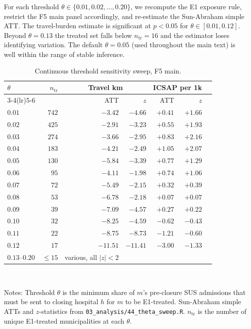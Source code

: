 For each
threshold $\theta \in \{0.01, 0.02, \ldots, 0.20\}$, we recompute the
E1 exposure rule, restrict the F5 main panel accordingly, and
re-estimate the Sun-Abraham simple ATT. The travel-burden estimate
is significant at $p < 0.05$ for $\theta \in [0.01, 0.12]$. Beyond
$\theta = 0.13$ the treated set falls below $n_{\text{tr}} = 16$ and
the estimator loses identifying variation. The default
$\theta = 0.05$ (used throughout the main text) is well within the
range of stable inference.

\begin{table}[h!]
\centering
\caption{Continuous threshold sensitivity sweep, F5 main.}
\label{tab:theta-sweep}
\begin{tabular}{lrrrrrr}
\toprule
$\theta$ & $n_{\text{tr}}$ &
\multicolumn{2}{c}{Travel km} & \multicolumn{2}{c}{ICSAP per 1k} &  \\
\cmidrule(lr){3-4}\cmidrule(lr){5-6}
& & ATT & $z$ & ATT & $z$ & \\
\midrule
$0.01$ & $742$ & $-3.42$ & $-4.66$ & $+0.41$ & $+1.66$ & \\
$0.02$ & $425$ & $-2.91$ & $-3.23$ & $+0.55$ & $+1.93$ & \\
$0.03$ & $274$ & $-3.66$ & $-2.95$ & $+0.83$ & $+2.16$ & \\
$0.04$ & $183$ & $-4.21$ & $-2.49$ & $+1.05$ & $+2.07$ & \\
$0.05$ & $130$ & $-5.84$ & $-3.39$ & $+0.77$ & $+1.29$ & \\
$0.06$ & $ 95$ & $-4.11$ & $-1.98$ & $+0.74$ & $+1.06$ & \\
$0.07$ & $ 72$ & $-5.49$ & $-2.15$ & $+0.32$ & $+0.39$ & \\
$0.08$ & $ 53$ & $-6.78$ & $-2.18$ & $+0.07$ & $+0.07$ & \\
$0.09$ & $ 39$ & $-7.09$ & $-4.57$ & $+0.27$ & $+0.22$ & \\
$0.10$ & $ 32$ & $-8.25$ & $-4.59$ & $-0.62$ & $-0.43$ & \\
$0.11$ & $ 22$ & $-8.75$ & $-8.73$ & $-1.21$ & $-0.60$ & \\
$0.12$ & $ 17$ & $-11.51$ & $-11.41$ & $-3.00$ & $-1.33$ & \\
$0.13$--$0.20$ & $\le 15$ & various, all $|z| < 2$ & & & & \\
\bottomrule
\end{tabular}
\\[0.5em]
\begin{minipage}{0.95\textwidth}
\footnotesize Notes: Threshold $\theta$ is the minimum share of
$m$'s pre-closure SUS admissions that must be sent to closing
hospital $h$ for $m$ to be E1-treated. Sun-Abraham simple ATTs and
$z$-statistics from \texttt{03\_analysis/44\_theta\_sweep.R}.
$n_{\text{tr}}$ is the number of unique E1-treated municipalities at
each $\theta$.
\end{minipage}
\end{table}


